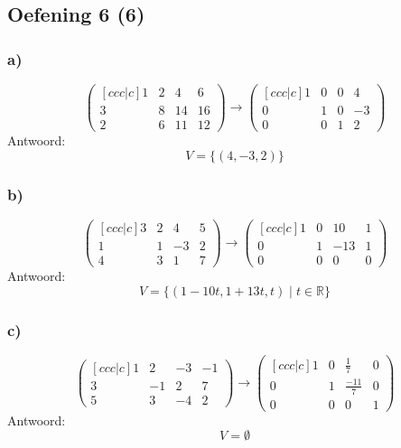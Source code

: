 \documentclass[lineaire_algebra_oplossingen.tex]{subfiles}
\begin{document}
\subsection{Oefening 6 (6)}
\subsubsection*{a)}
\[
\begin{pmatrix}[ccc|c]
1 &  2 &  4 &  6\\
3 &  8 & 14 & 16\\
2 &  6 & 11 & 12
\end{pmatrix}
\longrightarrow
\begin{pmatrix}[ccc|c]
1 &  0 &  0 &  4\\
0 &  1 &  0 & -3\\
0 &  0 &  1 &  2
\end{pmatrix}
\]
Antwoord:
\[
V=\{(4,-3,2)\}
\]

\subsubsection*{b)}
\[
\begin{pmatrix}[ccc|c]
3 &  2 &  4 &  5\\
1 &  1 & -3 &  2\\
4 &  3 &  1 &  7
\end{pmatrix}
\longrightarrow
\begin{pmatrix}[ccc|c]
1 &  0 & 10 &  1\\
0 &  1 & -13&  1\\
0 &  0 &  0 &  0
\end{pmatrix}
\]
Antwoord:
\[
V=\{(1-10t,1+13t,t) \mid t \in \mathbb{R}\}
\]

\subsubsection*{c)}
\[
\begin{pmatrix}[ccc|c]
1 &  2 & -3 & -1\\
3 & -1 &  2 &  7\\
5 &  3 & -4 &  2
\end{pmatrix}
\longrightarrow
\begin{pmatrix}[ccc|c]
1 &  0 & \frac{1}{7} &  0\\
0 &  1 & \frac{-11}{7}&  0\\
0 &  0 &  0 &  1
\end{pmatrix}
\]
Antwoord:
\[
V=\emptyset
\]
\end{document}
